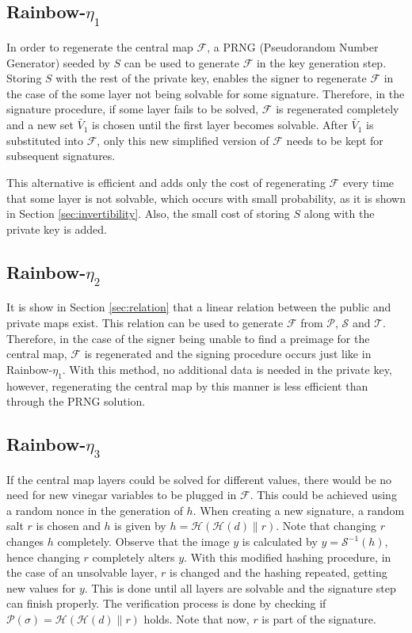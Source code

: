 \documentclass{ufsctex/ufsctex}
\begin{document}
\subsection{Rainbow-$\eta_1$}

In order to regenerate the central map $\mathcal{F}$, a
PRNG (Pseudorandom Number Generator)
seeded by $S$ can be used to generate $\mathcal{F}$ in the key generation step.
Storing $S$ with the rest of the private key, enables the signer to regenerate
$\mathcal{F}$ in the case of the some layer not being solvable for some
signature. Therefore, in the signature procedure, if some layer fails to be
solved, $\mathcal{F}$ is regenerated completely and a new set $\tilde{V_1}$ is
chosen until the first layer becomes solvable. After $\tilde{V_1}$ is
substituted into $\mathcal{F}$, only this new simplified version of
$\mathcal{F}$ needs to be kept for subsequent signatures.

This alternative is efficient and adds only the cost of regenerating
$\mathcal{F}$ every time that some layer is not solvable, which occurs with
small probability, as it is shown in Section \ref{sec:invertibility}. Also, the
small cost of storing $S$ along with the private key is added.

\subsection{Rainbow-$\eta_2$}

It is show in Section \ref{sec:relation} that a linear relation between the
public and private maps exist. This relation can be used to generate
$\mathcal{F}$ from $\mathcal{P}$, $\mathcal{S}$ and $\mathcal{T}$. Therefore,
in the case of the signer being unable to find a preimage for the central map,
$\mathcal{F}$ is regenerated and the signing procedure occurs just like in
Rainbow-$\eta_1$. With this method, no additional data is needed in the private
key, however, regenerating the central map by this manner is less efficient
than through the PRNG solution.

\subsection{Rainbow-$\eta_3$}\label{sec:rainboweta3}

If the central map layers could be solved for different values, there would be
no need for new vinegar variables to be plugged in $\mathcal{F}$. This could be
achieved using a random nonce in the generation of $h$. When creating a new
signature, a random salt $r$ is chosen and $h$ is given by $h =
\mathcal{H}(\mathcal{H}(d) \| r)$. Note that changing $r$ changes $h$
completely. Observe that the image $y$ is calculated by $y =
\mathcal{S}^{-1}(h)$, hence changing $r$ completely alters $y$. With this
modified hashing procedure, in the case of an unsolvable layer, $r$ is changed
and the hashing repeated, getting new values for $y$. This is done until all
layers are solvable and the signature step can finish properly. The
verification process is done by checking if $\mathcal{P}(\sigma) =
\mathcal{H}(\mathcal{H}(d) \| r)$ holds. Note that now, $r$ is part of the
signature.
\end{document}
